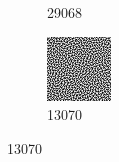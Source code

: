 \begin{figure}[H]
\begin{subfigure}[b]{0.2\linewidth}
         \caption{29068}
         \label{pic:abkühl_schritt_6}
    \end{subfigure}
    \begin{subfigure}[b]{0.2\linewidth}
        \includegraphics[width=\linewidth]{content/simulatedAnnealing/Bilder/Annealing/intermediate_applied_permutation_20_quasieqstepKirkpatrickCooldownSchedule_energy_13070-RGBA_r_channel.png}
        \caption{13070}
        \label{pic:abkühl_schritt_7}
    \end{subfigure}



\end{figure}
